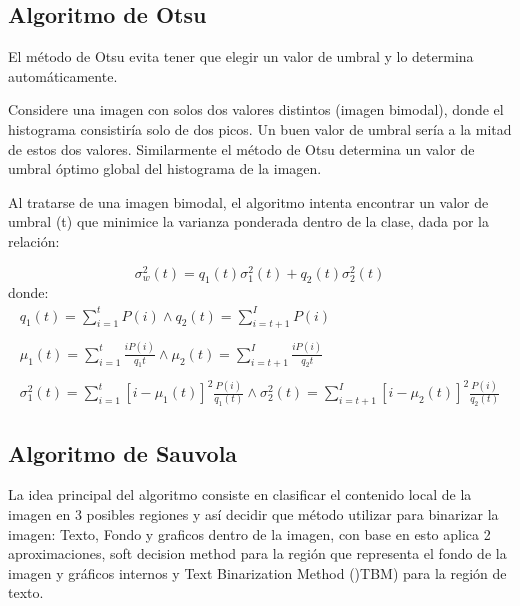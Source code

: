 \subsection{Algoritmo de Otsu}
El método de Otsu evita tener que elegir un valor de umbral y lo determina automáticamente.

Considere una imagen con solos dos valores distintos (imagen bimodal), donde el histograma consistiría solo de dos picos. Un buen valor de umbral sería a la mitad de estos dos valores. Similarmente el método de Otsu determina un valor de umbral óptimo global del histograma de la imagen.

Al tratarse de una imagen bimodal, el algoritmo intenta encontrar un valor de umbral (t) que minimice la varianza ponderada dentro de la clase, dada por la relación:

\begin{equation}
	\sigma _ {w} ^{2}(t) = q_{1}(t) \sigma _{1}^2(t) + q_{2}(t) \sigma _{2}^2(t)
\end{equation}
donde:
\begin{equation}
	\begin{array}{l}
		q_{1}(t) = \sum_{i=1}^{t} P(i) \wedge q_{2}(t) = \sum_{i=t+1}^{I} P(i)\\\\
		\mu_{1}(t) = \sum_{i=1}^{t} \frac{i P(i)}{q_1{t}} \wedge \mu_{2}(t) = \sum_{i=t+1}^{I} \frac{i P(i)}{q_2{t}}\\\\
		\sigma_{1}^2(t) = \sum_{i = 1}^{t} [i - \mu_{1}(t)]^2 \frac{P(i)}{q_{1}(t)} \wedge \sigma_{2}^2(t) = \sum_{i = t+1}^{I} [i - \mu_{2}(t)]^2 \frac{P(i)}{q_{2}(t)}
	\end{array}
\end{equation}



\subsection{Algoritmo de Sauvola}

La idea principal del algoritmo consiste en clasificar el contenido local de la imagen en 3 posibles regiones y así decidir que método utilizar para binarizar la imagen: Texto, Fondo y graficos dentro de la imagen, con base en esto aplica 2 aproximaciones, soft decision method para la región que representa el fondo de la imagen y gráficos internos y Text Binarization Method ()TBM) para la región de texto.

